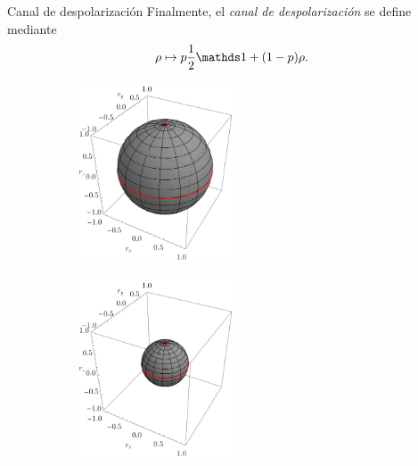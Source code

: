 \begin{frame}{Canal de despolarización}
    Finalmente, el \textit{canal de despolarización} se define mediante
    \begin{equation}
        \rho\mapsto p\frac{1}{2}\Id+(1-p)\rho\nonumber.
    \end{equation}
    \begin{figure}
        \centering
        \begin{subfigure}{0.45\textwidth}
            \centering
            \includegraphics[width=0.5\textwidth]{figures/whole_sphere.png}
        \end{subfigure}
        \begin{subfigure}{0.45\textwidth}
            \centering
            \includegraphics[width=0.5\textwidth]{figures/depol.png}
        \end{subfigure}
    \end{figure}
\end{frame}

